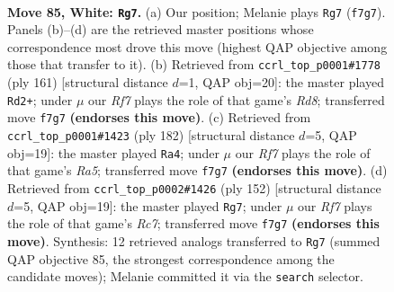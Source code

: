 \documentclass[11pt]{article}
\begin{document}
\clearpage

\begin{figure}[p]\centering
\begin{subfigure}{0.46\textwidth}\centering
\resizebox{\linewidth}{!}{%
\newchessgame
\chessboard[
  setfen={3n4/5R2/3k4/P7/8/7r/4K3/8 w - - 17 85},
  showmover=false,
  pgfstyle=straightmove, color=movearrow, markmove={f7-g7}
]}
\caption{}
\end{subfigure}\hfill
\begin{subfigure}{0.46\textwidth}\centering
\resizebox{\linewidth}{!}{%
\newchessgame
\chessboard[
  setfen={8/k7/7R/p7/8/2N5/5K2/3r4 b - - 11 81},
  showmover=false,
  pgfstyle=straightmove, color=movearrow, markmove={d1-d2}
]}
\caption{}
\end{subfigure}
\\[4pt]
\begin{subfigure}{0.46\textwidth}\centering
\resizebox{\linewidth}{!}{%
\newchessgame
\chessboard[
  setfen={8/8/4k3/R7/2n2K1P/1r6/6P1/8 w - - 3 92},
  showmover=false,
  pgfstyle=straightmove, color=movearrow, markmove={a5-a4}
]}
\caption{}
\end{subfigure}\hfill
\begin{subfigure}{0.46\textwidth}\centering
\resizebox{\linewidth}{!}{%
\newchessgame
\chessboard[
  setfen={5r2/2R5/8/3n4/8/P4k2/7K/8 w - - 18 77},
  showmover=false,
  pgfstyle=straightmove, color=movearrow, markmove={c7-g7}
]}
\caption{}
\end{subfigure}
\caption{\textbf{Move 85, White: \texttt{Rg7}.} (a) Our position; Melanie plays \texttt{Rg7} (\texttt{f7g7}). Panels (b)--(d) are the retrieved master positions whose correspondence most drove this move (highest QAP objective among those that transfer to it). (b) Retrieved from \texttt{ccrl\_top\_p0001\#1778} (ply 161) [structural distance $d$=1, QAP obj=20]: the master played \texttt{Rd2+}; under $\mu$ our \emph{Rf7} plays the role of that game's \emph{Rd8}; transferred move \texttt{f7g7} \textbf{(endorses this move)}. (c) Retrieved from \texttt{ccrl\_top\_p0001\#1423} (ply 182) [structural distance $d$=5, QAP obj=19]: the master played \texttt{Ra4}; under $\mu$ our \emph{Rf7} plays the role of that game's \emph{Ra5}; transferred move \texttt{f7g7} \textbf{(endorses this move)}. (d) Retrieved from \texttt{ccrl\_top\_p0002\#1426} (ply 152) [structural distance $d$=5, QAP obj=19]: the master played \texttt{Rg7}; under $\mu$ our \emph{Rf7} plays the role of that game's \emph{Rc7}; transferred move \texttt{f7g7} \textbf{(endorses this move)}. Synthesis: 12 retrieved analogs transferred to \texttt{Rg7} (summed QAP objective 85, the strongest correspondence among the candidate moves); Melanie committed it via the \texttt{search} selector.}
\label{fig:thought-m168}
\end{figure}
\end{document}
